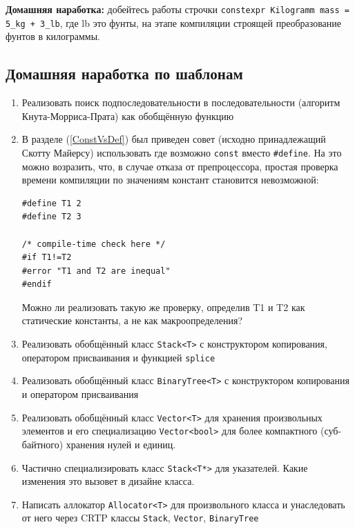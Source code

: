 \documentclass[a4paper,12pt,oneside]{article}
\begin{document}
\textbf{Домашняя наработка:} добейтесь работы строчки \lstinline!constexpr Kilogramm mass = 5_kg + 3_lb!, где lb это фунты, на этапе компиляции строящей преобразование фунтов в килограммы.

\pagebreak
\subsection{Домашняя наработка по шаблонам}

\begin{enumerate}

\item
Реализовать поиск подпоследовательности в последовательности (алгоритм Кнута-Морриса-Прата) как обобщённую функцию

\item
В разделе (\ref{ConstVsDef}) был приведен совет (исходно принадлежащий Скотту Майерсу) использовать где возможно \lstinline!const! вместо \lstinline!#define!. На это можно возразить, что, в случае отказа от препроцессора, простая проверка времени компиляции по значениям констант становится невозможной:

\begin{lstlisting}
#define T1 2
#define T2 3

/* compile-time check here */
#if T1!=T2
#error "T1 and T2 are inequal"
#endif
\end{lstlisting}

Можно ли реализовать такую же проверку, определив T1 и T2 как статические константы, а не как макроопределения?

\item
Реализовать обобщённый класс \lstinline!Stack<T>! с конструктором копирования, оператором присваивания и функцией \lstinline!splice!

\item
Реализовать обобщённый класс \lstinline!BinaryTree<T>! с конструктором копирования и оператором присваивания

\item
Реализовать обобщённый класс \lstinline!Vector<T>! для хранения произвольных элементов и его специализацию \lstinline!Vector<bool>! для более компактного (суб-байтного) хранения нулей и единиц.

\item
Частично специализировать класс \lstinline!Stack<T*>! для указателей. Какие изменения это вызовет в дизайне класса.

\item
Написать аллокатор \lstinline!Allocator<T>! для произвольного класса и унаследовать от него через CRTP классы \lstinline!Stack!, \lstinline!Vector!, \lstinline!BinaryTree!


\end{enumerate}
\end{document}
